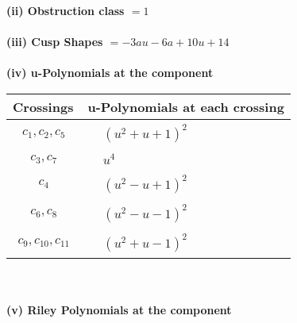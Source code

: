 \documentclass[1p]{elsarticle_modified}
\theoremstyle{definition}
\begin{document}
\flushleft \textbf{(ii) Obstruction class $= 1$}\\~\\
\flushleft \textbf{(iii) Cusp Shapes $= -3 a u-6 a+10 u+14$}\\~\\
\newpage\renewcommand{\arraystretch}{1}
\flushleft \textbf{(iv) u-Polynomials at the component}\newline \\
\begin{tabular}{m{50pt}|m{274pt}}
Crossings & \hspace{64pt}u-Polynomials at each crossing \\
\hline $$\begin{aligned}c_{1},c_{2},c_{5}\end{aligned}$$&$\begin{aligned}
&(u^2+u+1)^2
\end{aligned}$\\
\hline $$\begin{aligned}c_{3},c_{7}\end{aligned}$$&$\begin{aligned}
&u^4
\end{aligned}$\\
\hline $$\begin{aligned}c_{4}\end{aligned}$$&$\begin{aligned}
&(u^2- u+1)^2
\end{aligned}$\\
\hline $$\begin{aligned}c_{6},c_{8}\end{aligned}$$&$\begin{aligned}
&(u^2- u-1)^2
\end{aligned}$\\
\hline $$\begin{aligned}c_{9},c_{10},c_{11}\end{aligned}$$&$\begin{aligned}
&(u^2+u-1)^2
\end{aligned}$\\
\hline
\end{tabular}\\~\\
\newpage\renewcommand{\arraystretch}{1}
\flushleft \textbf{(v) Riley Polynomials at the component}\newline \\
\end{document}
